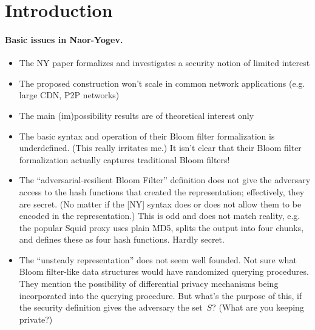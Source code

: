 \section{Introduction}
\paragraph{Basic issues in Naor-Yogev. }
\begin{itemize}
\item The NY paper formalizes and investigates a security notion of limited interest
\item The proposed construction won't scale in common network applications (e.g. large CDN, P2P networks)
\item The main (im)possibility results are of theoretical interest only
\item The basic syntax and operation of their Bloom filter formalization is underdefined.  (This really irritates me.)  It isn’t clear that their Bloom filter formalization actually captures traditional Bloom filters!  
\item The ``adversarial-resilient Bloom Filter'' definition does not give the adversary access to the hash functions that created the representation; effectively, they are secret. (No matter if the [NY] syntax does or does not allow them to be encoded in the representation.)  This is odd and does not match reality, e.g. the popular Squid proxy uses plain MD5, splits the output into four chunks, and defines these as four hash functions.  Hardly secret. 
\item The ``unsteady representation'' does not seem well founded.  Not sure what Bloom filter-like data structures would have randomized querying procedures.  They mention the possibility of differential privacy mechanisms being incorporated into the querying procedure.  But what's the purpose of this, if the security definition gives the adversary the set~$S$?  (What are you keeping private?) 
\end{itemize}

